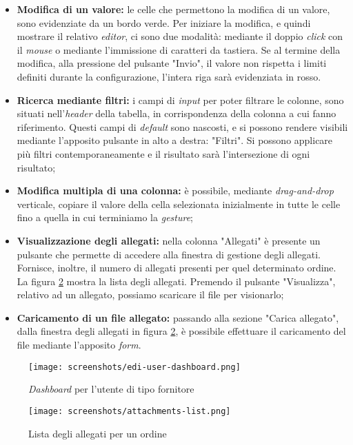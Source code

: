 \begin{itemize}
  \item \textbf{Modifica di un valore:} le celle che permettono la modifica di un valore, sono evidenziate da un bordo verde. Per iniziare la modifica, e quindi mostrare il relativo \emph{editor}, ci sono due modalità: mediante il doppio \emph{click} con il \emph{mouse} o mediante l'immissione di caratteri da tastiera. Se al termine della modifica, alla pressione del pulsante "Invio", il valore non rispetta i limiti definiti durante la configurazione, l'intera riga sarà evidenziata in rosso.
  \item \textbf{Ricerca mediante filtri:} i campi di \emph{input} per poter filtrare le colonne, sono situati nell'\emph{header} della tabella, in corrispondenza della colonna a cui fanno riferimento. Questi campi di \emph{default} sono nascosti, e si possono rendere visibili mediante l'apposito pulsante in alto a destra: "Filtri". Si possono applicare più filtri contemporaneamente e il risultato sarà l'intersezione di ogni risultato;
  \item \textbf{Modifica multipla di una colonna:} è possibile, mediante \emph{drag-and-drop} verticale, copiare il valore della cella selezionata inizialmente in tutte le celle fino a quella in cui terminiamo la \emph{gesture};
  \item \textbf{Visualizzazione degli allegati:} nella colonna "Allegati" è presente un pulsante che permette di accedere alla finestra di gestione degli allegati. Fornisce, inoltre, il numero di allegati presenti per quel determinato ordine. La figura \ref{fig:attachments-list} mostra la lista degli allegati. Premendo il pulsante "Visualizza", relativo ad un allegato, possiamo scaricare il file per visionarlo;
  \item \textbf{Caricamento di un file allegato:} passando alla sezione "Carica allegato", dalla finestra degli allegati in figura \ref{fig:attachments-list}, è possibile effettuare il caricamento del file mediante l'apposito \emph{form}.
\end{itemize}

\begin{figure}[!ht]
  \begin{center}
    \texttt{[image: screenshots/edi-user-dashboard.png]}
    \caption{\emph{Dashboard} per l'utente di tipo fornitore}
    \label{fig:dashboard}
  \end{center}
\end{figure}

\newpage
\begin{figure}[!ht]
  \begin{center}
    \texttt{[image: screenshots/attachments-list.png]}
    \caption{Lista degli allegati per un ordine}
    \label{fig:attachments-list}
  \end{center}
\end{figure}

